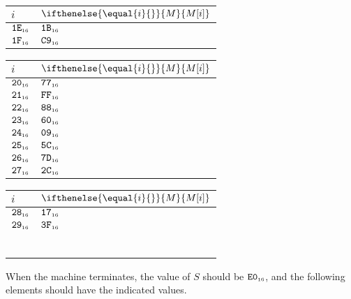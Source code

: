 \documentclass[a4paper,12pt]{article}
\makeatletter
\newcommand{\num}[1]{\texttt{#1}}
\newcommand{\hex}[1]{\num{#1}_{\textup{\tiny 16}}}
\newcommand{\MEM}[1]{\ifthenelse{\equal{#1}{}}{M}{M[#1]}}
\newcommand{\SP}{S}
\newenvironment{memtable}{%
  \begin{trivlist}
    \item
    }{%
    \end{trivlist}}
\newenvironment{memcolumn}{%
  \begin{tabular}{@{}ll@{}}
    $i$ & $\MEM{i}$ \\
    \hline}
    {%
    \hline
  \end{tabular}}
\newcommand{\memspace}{\qquad}
\makeatother
\begin{document}
\begin{memtable}
\begin{memcolumn}
    $\hex{1E}$ & $\hex{1B}$ \\
    $\hex{1F}$ & $\hex{C9}$ \\
  \end{memcolumn}
  \memspace
  \begin{memcolumn}
    $\hex{20}$ & $\hex{77}$ \\
    $\hex{21}$ & $\hex{FF}$ \\
    $\hex{22}$ & $\hex{88}$ \\
    $\hex{23}$ & $\hex{60}$ \\
    $\hex{24}$ & $\hex{09}$ \\
    $\hex{25}$ & $\hex{5C}$ \\
    $\hex{26}$ & $\hex{7D}$ \\
    $\hex{27}$ & $\hex{2C}$ \\
  \end{memcolumn}
  \memspace
  \begin{memcolumn}
    $\hex{28}$ & $\hex{17}$ \\
    $\hex{29}$ & $\hex{3F}$ \\
    \\
    \\
    \\
    \\
    \\
    \\
  \end{memcolumn}
\end{memtable}
When the machine terminates, the value of $\SP$ should be $\hex{E0}$, and the following elements should have the indicated values.
\end{document}
